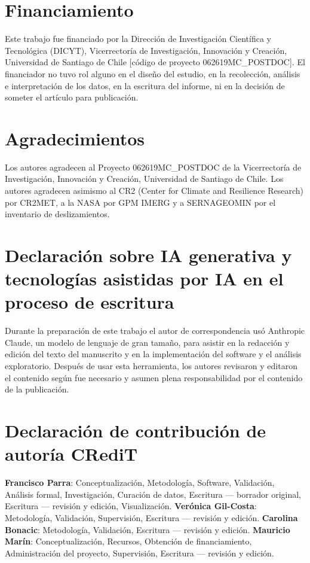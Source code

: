 \documentclass[authoryear,preprint,review,12pt]{elsarticle}
\begin{document}
\section*{Financiamiento}

Este trabajo fue financiado por la Dirección de Investigación Científica y
Tecnológica (DICYT), Vicerrectoría de Investigación, Innovación y Creación,
Universidad de Santiago de Chile [código de proyecto 062619MC\_POSTDOC]. El
financiador no tuvo rol alguno en el diseño del estudio, en la recolección,
análisis e interpretación de los datos, en la escritura del informe, ni en la
decisión de someter el artículo para publicación.

\section*{Agradecimientos}

Los autores agradecen al Proyecto 062619MC\_POSTDOC de la Vicerrectoría de
Investigación, Innovación y Creación, Universidad de Santiago de Chile. Los autores
agradecen asimismo al CR2 (Center for Climate and Resilience Research) por CR2MET,
a la NASA por GPM IMERG y a SERNAGEOMIN por el inventario de deslizamientos.

\section*{Declaración sobre IA generativa y tecnologías asistidas por IA en el proceso de escritura}

Durante la preparación de este trabajo el autor de correspondencia usó Anthropic Claude, un modelo de
lenguaje de gran tamaño, para asistir en la redacción y edición del texto del
manuscrito y en la implementación del software y el análisis exploratorio. Después
de usar esta herramienta, los autores revisaron y editaron el contenido según fue necesario
y asumen plena responsabilidad por el contenido de la publicación.

\section*{Declaración de contribución de autoría CRediT}

\textbf{Francisco Parra}: Conceptualización, Metodología, Software, Validación,
Análisis formal, Investigación, Curación de datos, Escritura --- borrador original,
Escritura --- revisión y edición, Visualización.
\textbf{Verónica Gil-Costa}: Metodología, Validación, Supervisión,
Escritura --- revisión y edición.
\textbf{Carolina Bonacic}: Metodología, Validación, Escritura --- revisión y edición.
\textbf{Mauricio Marín}: Conceptualización, Recursos, Obtención de financiamiento,
Administración del proyecto, Supervisión, Escritura --- revisión y edición.
\end{document}

